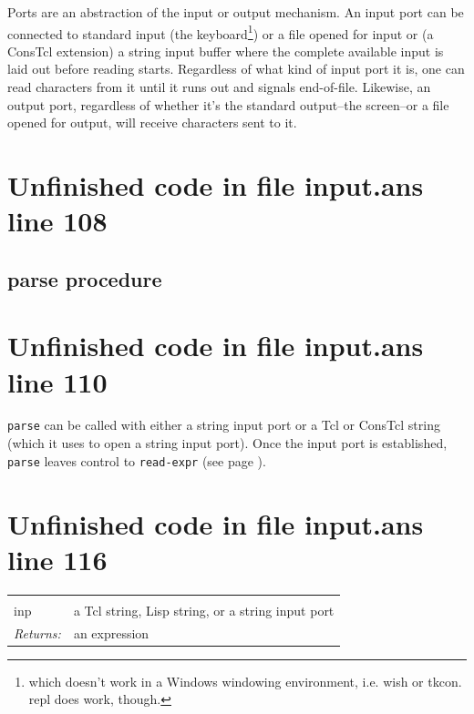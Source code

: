 \documentclass[twoside,9pt]{report}
\begin{document}
Ports are an abstraction of the input or output mechanism. An input port can be connected to standard input (the keyboard\footnote{which doesn't work in a Windows windowing environment, i.e. wish or tkcon. repl does work, though.}) or a file opened for input or (a ConsTcl extension) a string input buffer where the complete available input is laid out before reading starts. Regardless of what kind of input port it is, one can read characters from it until it runs out and signals end-of-file. Likewise, an output port, regardless of whether it's the standard output--the screen--or a file opened for output, will receive characters sent to it.

\section{Unfinished code in file input.ans line 108}
\subsection{parse procedure}
\label{parse-procedure}
\section{Unfinished code in file input.ans line 110}


\texttt{parse} can be called with either a string input port or a Tcl or ConsTcl string (which it uses to open a string input port). Once the input port is established, \texttt{parse} leaves control to \texttt{read-expr} (see page \pageref{read-expr-procedure}).

\section{Unfinished code in file input.ans line 116}
\noindent\begin{tabular}{ |p{1.9cm} p{8cm}| }
\hline
\rowcolor[HTML]{CCCCCC} \multicolumn{2}{|l|}{\bf parse (internal)} \\
inp & a Tcl string, Lisp string, or a string input port \\
\textit{Returns:} & an expression \\
\hline
\end{tabular}
\end{document}
